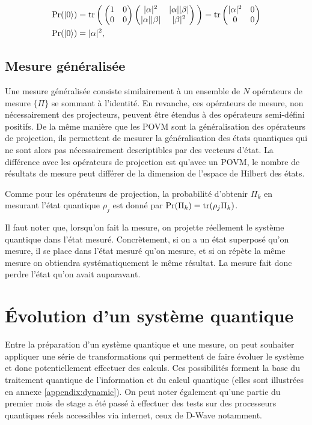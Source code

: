 \begin{align}
    \Pr(\ket{0}) &= \operatorname{tr}\bigg(\begin{pmatrix}1 & 0 \\ 0 & 0\end{pmatrix} \begin{pmatrix}|\alpha|^2 & |\alpha| |\beta| \\ |\alpha| |\beta| & |\beta|^2 \end{pmatrix}\bigg) = \operatorname{tr}\begin{pmatrix}|\alpha|^2 & 0 \\ 0 & 0\end{pmatrix} \\
    \Pr(\ket{0}) &= |\alpha|^2,
\end{align}

\subsection*{Mesure généralisée}

Une mesure généralisée consiste similairement à un ensemble de $N$ opérateurs de mesure $\{\Pi\}$ se sommant à l'identité. En revanche, ces opérateurs de mesure, non nécessairement des projecteurs, peuvent être étendus à des opérateurs semi-défini positifs. De la même manière que les POVM sont la généralisation des opérateurs de projection, ils permettent de mesurer la généralisation des états quantiques qui ne sont alors pas nécessairement descriptibles par des vecteurs d'état. La différence avec les opérateurs de projection est qu'avec un POVM, le nombre de résultats de mesure peut différer de la dimension de l'espace de Hilbert des états.

Comme pour les opérateurs de projection, la probabilité d'obtenir $\Pi_k$ en mesurant l'état quantique $\rho_j$ est donné par $\Pr(\Pi_k) = \operatorname{tr}(\rho_j \Pi_k)$. 

\medbreak

Il faut noter que, lorsqu'on fait la mesure, on projette réellement le système quantique dans l'état mesuré. Concrètement, si on a un état superposé qu'on mesure, il se place dans l'état mesuré qu'on mesure, et si on répète la même mesure on obtiendra systématiquement le même résultat. La mesure fait donc perdre l'état qu'on avait auparavant.

\section{\'Evolution d'un système quantique}

Entre la préparation d'un système quantique et une mesure, on peut souhaiter appliquer une série de transformations qui permettent de faire évoluer le système et donc potentiellement effectuer des calculs. Ces possibilités forment la base du traitement quantique de l'information et du calcul quantique (elles sont illustrées en annexe \ref{appendix:dynamic}). On peut noter également qu'une partie du premier mois de stage a été passé à effectuer des tests sur des processeurs quantiques réels accessibles via internet, ceux de D-Wave notamment.